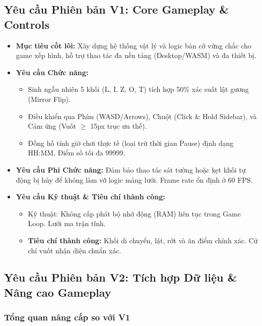 \documentclass[12pt,a4paper]{article}
\begin{document}
\subsection{Yêu cầu Phiên bản V1: Core Gameplay \& Controls}
\begin{itemize}[leftmargin=*]
    \item \textbf{Mục tiêu cốt lõi:} Xây dựng hệ thống vật lý và logic bàn cờ vững chắc cho game xếp hình, hỗ trợ thao tác đa nền tảng (Desktop/WASM) và đa thiết bị.
    \item \textbf{Yêu cầu Chức năng:}
    \begin{itemize}[noitemsep]
        \item Sinh ngẫu nhiên 5 khối (L, I, Z, O, T) tích hợp 50\% xác suất lật gương (Mirror Flip).
        \item Điều khiển qua Phím (WASD/Arrows), Chuột (Click \& Hold Sidebar), và Cảm ứng (Vuốt $\geq$ 15px trục ưu thế).
        \item Đồng hồ tính giờ chơi thực tế (loại trừ thời gian Pause) định dạng HH:MM. Điểm số tối đa 99999.
    \end{itemize}
    \item \textbf{Yêu cầu Phi Chức năng:} Đảm bảo thao tác sát tường hoặc kẹt khối tự động bị hủy để không làm vỡ logic mảng lưới. Frame rate ổn định ở 60 FPS.
    \item \textbf{Yêu cầu Kỹ thuật \& Tiêu chí thành công:}
    \begin{itemize}[noitemsep]
        \item Kỹ thuật: Không cấp phát bộ nhớ động (RAM) liên tục trong Game Loop. Lưới ma trận tĩnh.
        \item \textbf{Tiêu chí thành công:} Khối di chuyển, lật, rớt và ăn điểm chính xác. Cử chỉ vuốt nhận diện chuẩn xác.
    \end{itemize}
\end{itemize}


\subsection{Yêu cầu Phiên bản V2: Tích hợp Dữ liệu \& Nâng cao Gameplay}

\subsubsection{Tổng quan nâng cấp so với V1}
\end{document}

